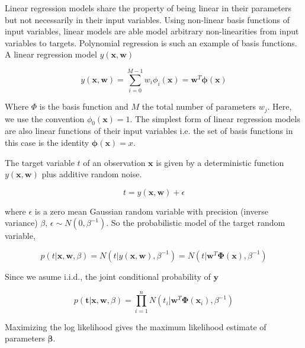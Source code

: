 Linear regression models share the property of being linear in their parameters but not necessarily in their input variables.
Using non-linear basis functions of input variables, linear models are able model arbitrary non-linearities from input variables to targets.  
Polynomial regression is such an example of basis functions.
A linear regression model $y(\bm{x},\bm{w})$

\begin{equation}
y(\bm{x},\bm{w}) = \sum_{i=0}^{M-1} w_i \phi_i(\bm{x}) = \bm{w}^T \bm{\phi}(\bm{x})
\end{equation}

Where $\Phi$ is the basis function and $M$ the total number of parameters $w_j$.
Here, we use the convention $\phi_0(\bm{x})=1$.
The simplest form of linear regression models are also linear functions of their input variables i.e. the set of basis functions in this case is the identity $\bm{\phi}(\bm{x})=x$. 

The target variable $t$ of an observation $\bm{x}$ is given by a deterministic function $y(\bm{x},\bm{w})$ plus additive random noise.

\begin{equation}
 t = y(\bm{x},\bm{w}) + \epsilon
\end{equation}

where $\epsilon$ is a zero mean Gaussian random variable with precision (inverse variance) $\beta$, $\epsilon \sim N(0,\beta^{-1})$.
So the probabilistic model of the target random variable,

\begin{equation}
p(t | \bm{x}, \bm{w}, \beta) = N(t | y(\bm{x},\bm{w}), \beta^{-1}) = N(t | \bm{w}^T \bm{\Phi}(\bm{x}) , \beta^{-1})
\end{equation}

Since we asume i.i.d., the joint conditional probability of $\bm{y}$

\begin{equation}
p(\bm{t} | \bm{x}, \bm{w}, \beta) = \prod_{i=1}^n N(t_i | \bm{w}^T \bm{\Phi}(\bm{x}_i) , \beta^{-1})
\end{equation}


Maximizing the log likelihood gives the maximum likelihood estimate of parameters $\bm{\beta}$.

